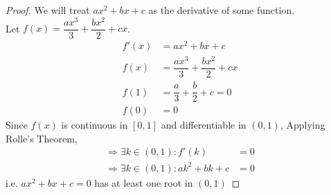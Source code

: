 \documentclass[14]{article}
\theoremstyle{definition}
\begin{document}
\begin{proof}
We will treat $ax^2 + bx + c$ as the derivative of some function.\\
Let $f(x) = \dfrac{ax^3}{3} + \dfrac{bx^2}{2} + cx$.
\begin{align*}
f'(x) &= ax^2 + bx + c\\
f(x) &= \dfrac{ax^3}{3} + \dfrac{bx^2}{2} + cx\\
f(1) &= \dfrac{a}3 + \dfrac{b}2 + c = 0\\
f(0) &= 0
\end{align*}
Since $f(x)$ is continuous in $[0, 1]$ and differentiable in $(0, 1)$, Applying Rolle's Theorem,\\
\begin{align*}
\Rightarrow \exists k \in (0, 1) : f'(k) &= 0\\
\Rightarrow \exists k \in (0, 1) : ak^2 + bk + c &= 0
\end{align*}
i.e. $ax^2 + bx + c = 0$ has at least one root in $(0, 1)$
\end{proof}
\pagebreak
\end{document}
